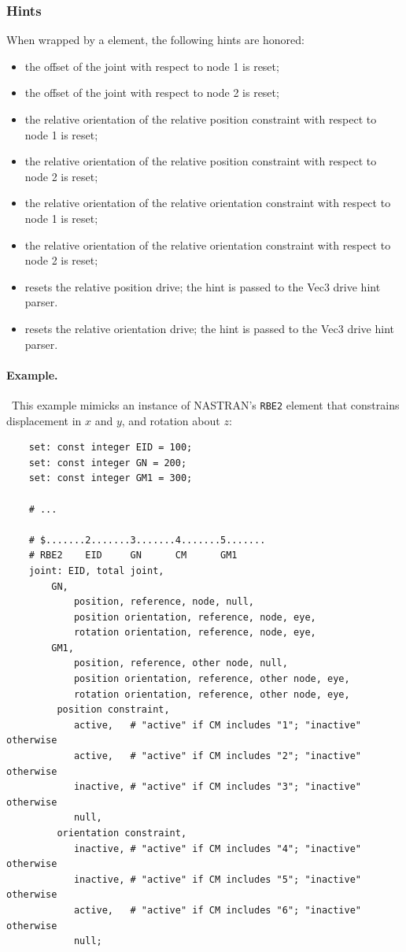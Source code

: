 \subsubsection{Hints}
When wrapped by a  element, the following hints are honored:
\begin{itemize}
\item {} the offset of the joint
with respect to node 1 is reset;
\item {} the offset of the joint
with respect to node 2 is reset;
\item {} the relative orientation
of the relative position constraint with respect to node 1 is reset;
\item {} the relative orientation 
of the relative position constraint with respect to node 2 is reset;
\item {} the relative orientation
of the relative orientation constraint with respect to node 1 is reset;
\item {} the relative orientation 
of the relative orientation constraint with respect to node 2 is reset;
\item {} resets the relative position drive;
the hint is passed to the Vec3 drive hint parser.
\item {} resets the relative orientation drive;
the hint is passed to the Vec3 drive hint parser.
\end{itemize}



\paragraph{Example.} \
This example mimicks an instance of NASTRAN's \texttt{RBE2} element
that constrains displacement in $x$ and $y$, and rotation about $z$:
\begin{verbatim}
    set: const integer EID = 100;
    set: const integer GN = 200;
    set: const integer GM1 = 300;

    # ...

    # $.......2.......3.......4.......5.......
    # RBE2    EID     GN      CM      GM1
    joint: EID, total joint,
        GN,
            position, reference, node, null,
            position orientation, reference, node, eye,
            rotation orientation, reference, node, eye,
        GM1,
            position, reference, other node, null,
            position orientation, reference, other node, eye,
            rotation orientation, reference, other node, eye,
         position constraint,
            active,   # "active" if CM includes "1"; "inactive" otherwise
            active,   # "active" if CM includes "2"; "inactive" otherwise
            inactive, # "active" if CM includes "3"; "inactive" otherwise
            null,
         orientation constraint,
            inactive, # "active" if CM includes "4"; "inactive" otherwise
            inactive, # "active" if CM includes "5"; "inactive" otherwise
            active,   # "active" if CM includes "6"; "inactive" otherwise
            null;
\end{verbatim}



